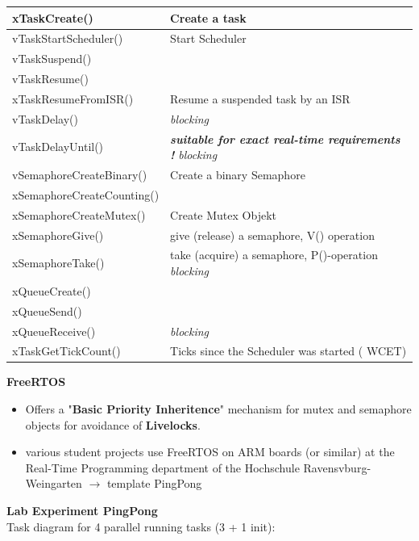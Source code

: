 \begin{tabular}{|p{1.6in}|p{3.0in}|} \hline 
xTaskCreate() & Create a task \\ \hline 
vTaskStartScheduler() & Start Scheduler \\ \hline 
vTaskSuspend() &  \\ \hline 
vTaskResume() &  \\ \hline 
xTaskResumeFromISR() & Resume a suspended task by an ISR \\ \hline 
vTaskDelay() &                    \textit{blocking} \\ \hline 
vTaskDelayUntil() & \textbf{\textit{ suitable for exact real-time requirements !  }}\textit{blocking}\textbf{\textit{}} \\ \hline 
\textbf{\textit{}}vSemaphoreCreateBinary() & Create a binary Semaphore \\ \hline 
xSemaphoreCreateCounting() &  \\ \hline 
xSemaphoreCreateMutex()  & Create Mutex Objekt \\ \hline 
xSemaphoreGive() & give (release) a semaphore, V() operation \\ \hline 
xSemaphoreTake() & take (acquire) a semaphore, P()-operation    \textit{blocking} \\ \hline 
xQueueCreate() &  \\ \hline 
xQueueSend() &  \\ \hline 
xQueueReceive() &                    \textit{blocking} \\ \hline 
xTaskGetTickCount() & Ticks since the Scheduler was started ( WCET) \\ \hline 
\end{tabular}
\newpage
{\rot\bf FreeRTOS }\\
\begin{itemize}
\item Offers a "\textbf{Basic Priority Inheritence}" mechanism for mutex and semaphore objects for avoidance of \textbf{Livelocks}.
\item various student projects use FreeRTOS on ARM boards (or similar) at the Real-Time Programming department of the Hochschule Ravensvburg-Weingarten $\rightarrow$ template PingPong
\end{itemize}

{\rot\bf Lab Experiment PingPong}\\

Task diagram for 4 parallel running tasks (3 + 1 init):\\

